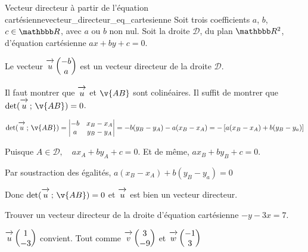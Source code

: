 \documentclass[10pt,a4paper,openany,twoside, prof]{book}
\begin{document}
\begin{prop}{Vecteur directeur à partir de l'équation cartésienne}{vecteur_directeur_eq_cartesienne}
Soit trois coefficients $a$, $b$, $c \in \R$, avec $a$ ou $b$ non nul. Soit la droite $\mathcal{D}$, du plan $\R^2$, d'équation cartésienne $ax+by+c=0$.

Le vecteur $\overrightarrow{\,\mathstrut u\,} \begin{pmatrix}-b\\a\end{pmatrix}$ est un vecteur directeur de la droite $\mathcal{D}$.
\end{prop}

\begin{dem}{}{}
\begin{reponse}
   Il faut montrer que $\overrightarrow{\,\mathstrut u\,}$ et $\v{AB}$ sont colinéaires. Il suffit de montrer que $\det{\vecu}{\v{AB}}=0$.

   $$\det{\vecu}{\v{AB}} = \Det{-b & x_B-x_A \\ a & y_B-y_A} = -b(y_B-y_A)- a(x_B-x_A) = - \left[a(x_B-x_A)+b(y_B-y_a)\right]$$

   Puisque $A\in\mathcal{D},\quad ax_A+by_A+c=0$. Et de même, $ax_B+by_B+c=0$.

   Par soustraction des égalités, $a(x_B-x_A)+b(y_B-y_a)=0$

   \medskip
   Donc $\det{\vecu}{\v{AB}}=0$ et $\overrightarrow{\,\mathstrut u\,}$ est bien un vecteur directeur.
\end{reponse}
\end{dem}


\begin{ex}{}{}
   Trouver un vecteur directeur de la droite d'équation cartésienne $-y-3x=7$.

   \begin{reponse}
      $\overrightarrow{\,\mathstrut u\,} \begin{pmatrix}1\\-3\end{pmatrix}$ convient. Tout comme $\overrightarrow{\,\mathstrut v\,} \begin{pmatrix}3\\-9\end{pmatrix}$ et $\overrightarrow{\,\mathstrut w\,} \begin{pmatrix}-1\\3\end{pmatrix}$
   \end{reponse}

   \end{ex}
\end{document}
